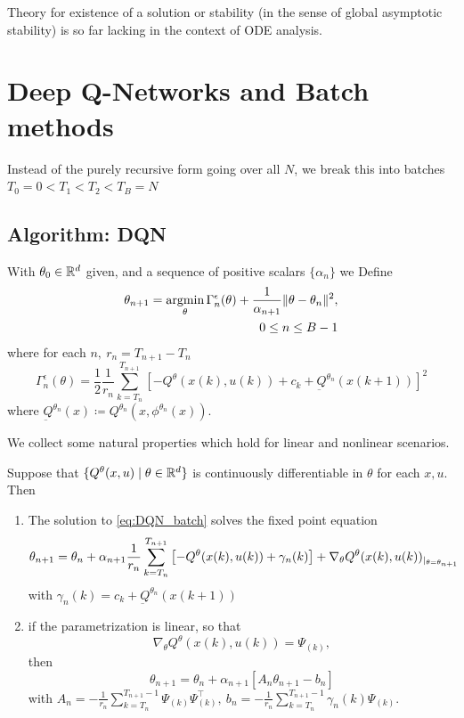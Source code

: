 Theory for existence of a solution or stability (in the sense of global asymptotic stability)
is so far lacking in the context of ODE analysis.

\section{Deep Q-Networks and Batch methods}
Instead of the purely recursive form going over all 
\(N\), we break this into batches  \(T_0=0<T_1<T_2<T_B=N\)

\subsection{Algorithm: DQN}
With \(\theta_0\in \mathbb{R}^d\) given, and a sequence of positive scalars \(\{\alpha_n\}\) we Define
\begin{eqnarray}\label{eq:DQN_batch}
    \theta_{n+1}=\operatorname*{\text{argmin}}_{\theta}\Gamma_n^\epsilon(\theta)+\frac{1}{\alpha_{n+1}}\Vert \theta-\theta_n\Vert^2,\\ 0\leq n\leq B-1
\end{eqnarray}
where for each \(n,\ r_n=T_{n+1}-T_n\)
\[\Gamma_n^\epsilon(\theta)=\frac{1}{2}\frac{1}{r_n}\sum_{k=T_n}^{T_{n+1}}\left[-Q^\theta(x(k),u(k))+c_k+\underbar{Q}^{\theta_n}(x(k+1))\right]^2\]
where \(\underbar{Q}^{\theta_n}(x)\coloneqq Q^{\theta_n}(x,\phi^{\theta_n}(x))\).

We collect some natural properties which hold for linear and nonlinear scenarios.
\begin{proposition}\label{prop:51}
    Suppose that \(\{Q^\theta(x,u)\mid \theta\in \mathbb{R}^d\}\) is continuously differentiable in \(\theta\)
    for each \(x,u\). Then 
    \begin{enumerate}
        \item The solution to \ref{eq:DQN_batch} solves the fixed point equation \[\theta_{n+1}=\theta_n+\alpha_{n+1}\frac{1}{r_n}\sum_{k=T_n}^{T_{n+1}}\left[-Q^\theta(x(k),u(k))+\gamma_n(k)\right]+\nabla_\theta Q^\theta(x(k),u(k))_{|_{\theta=\theta_{n+1}}}\] with \(\gamma_n(k)=c_k+\underbar{Q}^{\theta_n}(x(k+1))\)
        \item if the parametrization is linear, so that \[\nabla_\theta Q^\theta(x(k),u(k))=\Psi_{(k)},\] then \[\theta_{n+1}=\theta_n+\alpha_{n+1}\left[A_n\theta_{n+1}-b_n\right]\] with \(A_n=-\frac{1}{r_n}\sum_{k=T_n}^{T_{n+1}-1}\Psi_{(k)}\Psi_{(k)}^\intercal,\ b_n=-\frac{1}{r_n}\sum_{k=T_n}^{T_{n+1}-1}\gamma_n(k)\Psi_{(k)}\). 
    \end{enumerate}
\end{proposition}

